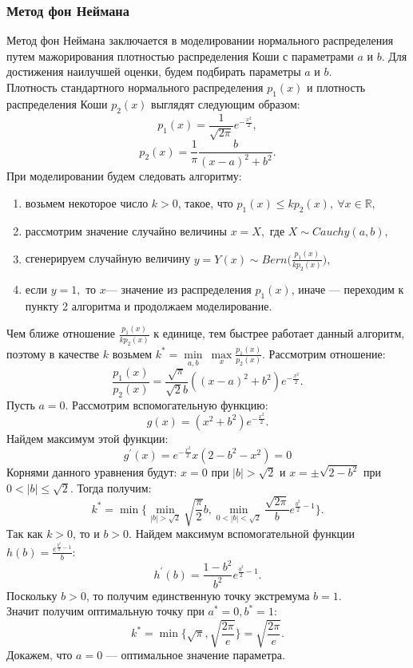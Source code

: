 \documentclass[11pt]{article}
\begin{document}
\subsubsection{Метод фон Неймана}
Метод фон Неймана заключается в моделировании нормального распределения путем мажорирования плотностью распределения Коши с параметрами $a$ и $b$. Для достижения наилучшей оценки, будем подбирать параметры $a$ и $b$.\\
Плотность стандартного нормального распределения $p_1(x)$ и плотность распределения Коши $p_2(x)$ выглядят следующим образом:
\[ p_1(x) = \frac{1}{\sqrt{2\pi}}e^{-\frac{x^2}{2}}, \]
\[p_2(x) = \frac{1}{\pi}\frac{b}{(x- a)^2 + b^2}. \]
При моделировании будем следовать алгоритму:
\begin{enumerate}
	\item возьмем некоторое число $k > 0$, такое, что $p_1(x) \leq kp_2(x), \ \forall x \in \mathbb{R},$ 
	\item рассмотрим значение случайно величины $x = X,$ где $X \sim Cauchy(a,b),$
	\item сгенерируем случайную величину $y = Y(x) \sim Bern\big(\frac{p_1(x)}{kp_2(x)}\big), $
	\item если $y = 1,$ то $x$--- значение из распределения $p_1(x)$, иначе --- переходим к пункту 2 алгоритма и продолжаем моделирование.
\end{enumerate}
Чем ближе отношение $\frac{p_1(x)}{kp_2(x)}$ к единице, тем быстрее работает данный алгоритм, поэтому в качестве $k$ возьмем $k^* = \underset{a,b}{\min} \ \underset{x}{\max}\frac{p_1(x)}{p_2(x)}$. Рассмотрим отношение: 
\[ \frac{p_1(x)}{p_2(x)} = \frac{\sqrt{\pi}}{\sqrt{2}b}((x - a)^2 + b^2)e^{-\frac{x^2}{2}}. \]
Пусть $a = 0$. Рассмотрим вспомогательную функцию:
\[ g(x) = (x^2 + b^2)e^{-\frac{x^2}{2}}. \]
Найдем максимум этой функции:
\[ g^{'}(x) = e^{-\frac{x^2}{2}}x(2 - b^2 - x^2) = 0 \]
Корнями данного уравнения будут: $x = 0 $ при $|b| > \sqrt{2}$ и $x = \pm \sqrt{2 - b^2}$ при $0 < |b| \leq \sqrt{2}.$
Тогда получим:
\[ k^* = \min \bigg\{\underset{|b| > \sqrt{2}}{\min}\sqrt{\frac{\pi}{2}}b, \underset{0 < |b| < \sqrt{2}}{\min} \frac{\sqrt{2\pi}}{b}e^{\frac{b^2}{2} - 1} \bigg\}. \]
Так как $k > 0$, то и $b > 0$. Найдем максимум вспомогательной функции $h(b) = \frac{e^{\frac{b^2}{2} - 1}}{b}$:
\[ h^{'}(b) = \frac{1 - b^2}{b^2}e^{\frac{b^2}{2} - 1}.\]
Поскольку $b > 0$, то получим единственную точку экстремума $b = 1.$\\
Значит получим оптимальную точку при $a^* = 0, b^* = 1:$
\[ k^* = \min \bigg\{ \sqrt{\pi},\sqrt{\frac{2\pi}{e}} \bigg\} = \sqrt{\frac{2\pi}{e}}. \]
Докажем, что $a = 0$ --- оптимальное значение параметра.
\end{document}
